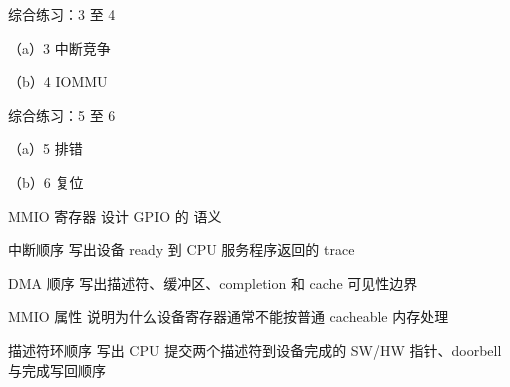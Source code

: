 \begin{chapterexercise}{综合练习：3 至 4}
\begin{exercisesubproblem}{（a）3}
中断竞争
\end{exercisesubproblem}
\begin{exercisesubproblem}{（b）4}
IOMMU
\end{exercisesubproblem}
\end{chapterexercise}

\begin{chapterexercise}{综合练习：5 至 6}
\begin{exercisesubproblem}{（a）5}
排错
\end{exercisesubproblem}
\begin{exercisesubproblem}{（b）6}
复位
\end{exercisesubproblem}
\end{chapterexercise}

\begin{chapterexercise}{MMIO 寄存器}
设计 GPIO 的  语义
\end{chapterexercise}

\begin{chapterexercise}{中断顺序}
写出设备 ready 到 CPU 服务程序返回的 trace
\end{chapterexercise}

\begin{chapterexercise}{DMA 顺序}
写出描述符、缓冲区、completion 和 cache 可见性边界
\end{chapterexercise}

\begin{chapterexercise}{MMIO 属性}
说明为什么设备寄存器通常不能按普通 cacheable 内存处理
\end{chapterexercise}

\begin{chapterexercise}{描述符环顺序}
写出 CPU 提交两个描述符到设备完成的 SW/HW 指针、doorbell 与完成写回顺序
\end{chapterexercise}


